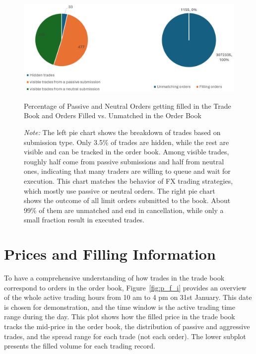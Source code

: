 \begin{figure}[h]
    \centering
    \includegraphics[width=0.8\linewidth]{figures/percentage_of_AT_unmatch.png}
    \caption{Percentage of Passive and Neutral Orders getting filled in the Trade Book and Orders Filled vs. Unmatched in the Order Book}
    \caption*{\textit{Note:} The left pie chart shows the breakdown of trades based on submission type. Only 3.5\% of trades are hidden, while the rest are visible and can be tracked in the order book. Among visible trades, roughly half come from passive submissions and half from neutral ones, indicating that many traders are willing to queue and wait for execution. This chart matches the behavior of FX trading strategies, which mostly use passive or neutral orders. The right pie chart shows the outcome of all limit orders submitted to the book. About 99\% of them are unmatched and end in cancellation, while only a small fraction result in executed trades.}
    \label{fig:p_of_AT_unma}
\end{figure}


\section{Prices and Filling Information} \label{sec:price}
To have a comprehensive understanding of how trades in the trade book correspond to orders in the order book, Figure~\ref{fig:p_f_i} provides an overview of the whole active trading hours from 10 am to 4 pm on 31st January. This date is chosen for demonstration, and the time window is the active trading time range during the day. This plot shows how the filled price in the trade book tracks the mid-price in the order book, the distribution of passive and aggressive trades, and the spread range for each trade (not each order). The lower subplot presents the filled volume for each trading record.



